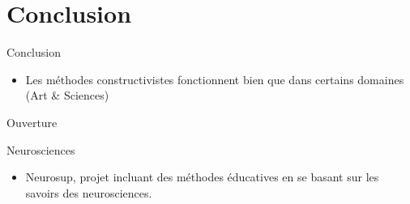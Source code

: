 \section{Conclusion}

\begin{frame}{Conclusion}
  \begin{itemize}
    \item Les méthodes constructivistes fonctionnent bien que dans certains domaines (Art \& Sciences)
  \end{itemize}
\end{frame}

\begin{frame}{Ouverture}
  \begin{block}{Neurosciences}
    \begin{itemize}
      \item Neurosup, projet incluant des méthodes éducatives en se basant sur les savoirs des neurosciences.
    \end{itemize}
  \end{block}
\end{frame}

